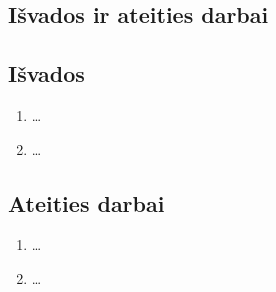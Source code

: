\subsection*{Išvados ir ateities darbai}\label{chap:fivelt}
\subsection*{Išvados}
\begin{enumerate}[leftmargin=*]
	\item \dots

	\item \dots
\end{enumerate}

\subsection*{Ateities darbai}
\begin{enumerate}[leftmargin=*]
	\item \dots
	\item \dots
\end{enumerate}
